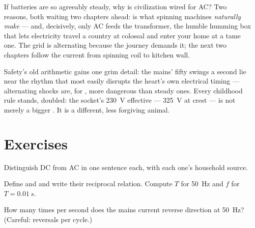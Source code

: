 \begin{remark}\label{rem:g9:alternating-current:why}
If batteries are so agreeably steady, why is civilization
wired for AC? Two reasons, both waiting two chapters ahead:
 is what spinning machines \emph{naturally
make} --- and, decisively, only AC feeds the transformer,
the humble humming box that lets electricity travel a country
at colossal  and enter your home at a tame one. The
grid is alternating because the journey demands it; the next
two chapters follow the current from spinning coil to
kitchen wall.
\end{remark}

\begin{remark}\label{rem:g9:alternating-current:safety}
Safety's old arithmetic gains one grim detail: the mains'
fifty swings a second lie near the rhythm that most easily
disrupts the heart's own electrical timing --- alternating
shocks are,  for , more dangerous than steady
ones. Every childhood rule stands, doubled: the socket's
\qty{230}{V} effective --- \qty{325}{V} at crest --- is not
merely a bigger . It is a different, less forgiving
animal.
\end{remark}

\section{Exercises}

\begin{exercise}[$\star$]\label{exo:g9:alternating-current:1}
Distinguish DC from AC in one sentence each, with each one's
household source.
\end{exercise}

\begin{exercise}[$\star$]\label{exo:g9:alternating-current:2}
Define  and  and write their reciprocal
relation. Compute $T$ for \qty{50}{Hz} and $f$ for
$T = \qty{0.01}{s}$.
\end{exercise}

\begin{exercise}[$\star$]\label{exo:g9:alternating-current:3}
How many times per second does the mains current reverse
direction at \qty{50}{Hz}? (Careful: reversals per cycle.)
\end{exercise}

